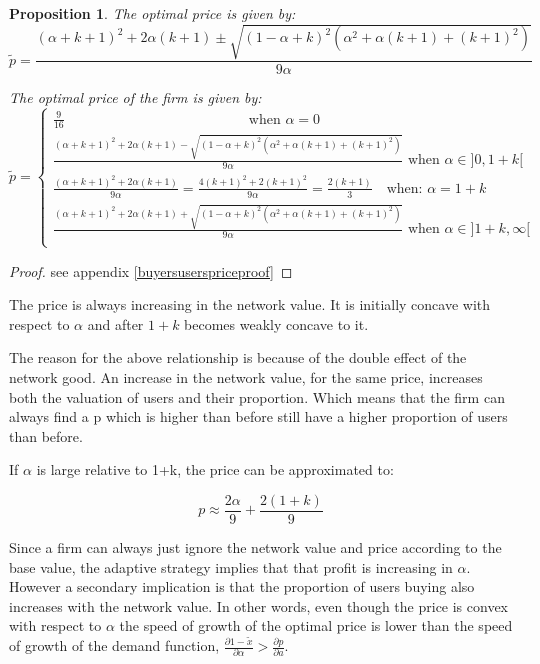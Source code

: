 \documentclass[11pt]{article}
\newtheorem{proposition}{Proposition}
\begin{document}
\begin{proposition}
\label{buyersusersprice}
The optimal price is given by:
\begin{equation*}
\tilde{p} = \frac{(\alpha+k+1)^2+2\alpha(k+1) \pm \sqrt{(1-\alpha+k)^2(\alpha^2+\alpha (k+1)+(k+1)^2)}}{9 \alpha}
\end{equation*}


\label{priceusersprice}

The optimal price of the firm is given by:
\[
\tilde{p}= \left\{
                \begin{array}{ll}
\frac{9}{16} ~~~~~~~~~~~~~~~~~~~~~~~~~~~~~~~~~~~~~~~~~~~~~~~~~~~~~~~~~~
\text{ when  } \alpha = 0
\\
\frac{(\alpha+k+1)^2+2\alpha(k+1) - \sqrt{(1-\alpha+k)^2(\alpha^2+\alpha (k+1)+(k+1)^2)}}{9 \alpha} \text{ when  } \alpha \in ]0,1+k[
\\
\frac{(\alpha+k+1)^2+2\alpha(k+1)}{9 \alpha}= \frac{4(k+1)^2+2(k+1)^2}{9 \alpha}=\frac{2(k+1)}{3 }~~~\text{ when: } \alpha =1+k
                  \\
\frac{(\alpha+k+1)^2+2\alpha(k+1) + \sqrt{(1-\alpha+k)^2(\alpha^2+\alpha (k+1)+(k+1)^2)}}{9 \alpha} \text{ when  } \alpha \in ]1+k,\infty [ \\
 \end{array}
 \right.
\]

\end{proposition}

\begin{proof}
see appendix \ref{buyersuserspriceproof}
\end{proof}

The price is always increasing in the network value. It is initially concave with respect to $\alpha$ and after $1+k$ becomes weakly concave to it. 


The reason for the above relationship is because of the double effect of the network good. An increase in the network value, for the same price, increases both the valuation of users and their proportion. Which means that the firm can always find a p which is higher than before still have a higher proportion of users than before.

If $\alpha$ is large relative to 1+k, the price can be approximated to:

\begin{equation}
p \approx \frac{2\alpha}{9}+\frac{2(1+k)}{9}
\end{equation}


Since a firm can always just ignore the network value and price according to the base value, the adaptive strategy implies that that profit is increasing in $\alpha$. However a secondary implication is that the proportion of users buying also increases with the network value. In other words, even though the price is convex with respect to $\alpha$ the speed of growth of the optimal price is lower than the speed of growth of the demand function, $\frac{\partial 1-\tilde{x}}{\partial \alpha} > \frac{\partial p}{\partial a}$.
\end{document}
